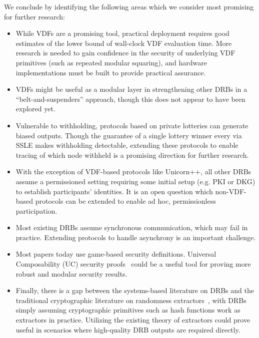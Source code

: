We conclude by identifying the following areas which we consider most promising for further research:
\begin{itemize}
    \item While VDFs are a promising tool, practical deployment requires good estimates of the lower bound of wall-clock VDF evaluation time. More research is needed to gain confidence in the security of underlying VDF primitives (such as repeated modular squaring), and hardware implementations must be built to provide practical assurance.
    \item VDFs might be useful as a modular layer in strengthening other DRBs in a ``belt-and-suspenders'' approach, though this does not appear to have been explored yet.
    \item Vulnerable to withholding, protocols based on private lotteries can generate biased outputs. Though the guarantee of a single lottery winner every \epoch via SSLE makes withholding detectable, extending these protocols to enable tracing of which node withheld is a promising direction for further research.
    \item With the exception of VDF-based protocols like Unicorn++, all other DRBs assume a permissioned setting requiring some initial setup (e.g. PKI or DKG) to establish participants' identities. It is an open question which non-VDF-based protocols can be extended to enable ad hoc, permissionless participation.
    \item Most existing DRBs assume synchronous communication, which may fail in practice. Extending protocols to handle asynchrony is an important challenge.
    \item Most papers today use game-based security definitions. Universal Composability (UC) security proofs~\cite{canetti2001universally} could be a useful tool for proving more robust and modular security results.
    \item Finally, there is a gap between the systems-based literature on DRBs and the traditional cryptographic literature on randomness extractors~\cite{trevisan2000extracting,trevisan2001extractors}, with DRBs simply assuming cryptographic primitives such as hash functions work as extractors in practice. Utilizing the existing theory of extractors could prove useful in scenarios where high-quality DRB outputs are required directly.

\end{itemize}
